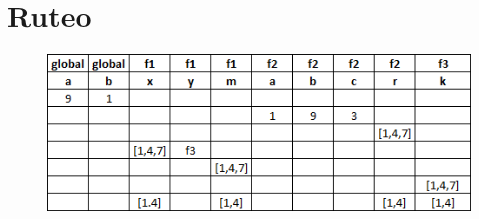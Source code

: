 \section{Ruteo}
\begin{figure}[h]
    \centering
    \includegraphics{Imagenes/pauta.png}
\end{figure}